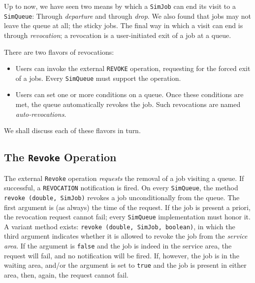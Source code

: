 \documentclass[12pt]{book}
\begin{document}
Up to now,
  we have seen two means by which a \lstinline|SimJob|
  can end its visit to a \lstinline|SimQueue|:
  Through {\em departure\/}
  and through {\em drop}.
We also found that jobs may not leave the queue at all;
  the sticky jobs.
The final way in which a visit can end is through {\em revocation};
  a revocation is a user-initiated exit of a job at a queue.

There are two flavors of revocations:
\begin{itemize}
\item
  Users can invoke the external \lstinline|REVOKE| operation,
    requesting for the forced exit of a jobs.
  Every \lstinline|SimQueue| must support the operation.
\item
  Users can set one or more conditions on a queue.
  Once these conditions are met, the queue automatically
    revokes the job.
  Such revocations are named {\em auto-revocations}.
\end{itemize}

We shall discuss each of these flavors in turn.

\subsection{The \texttt{Revoke} Operation}

The external \lstinline|Revoke| operation
  {\em requests\/} the removal of a job visiting a queue.
If successful,
  a \lstinline|REVOCATION| notification is fired.
On every \lstinline|SimQueue|,
  the method \lstinline|revoke (double, SimJob)|
  revokes a job unconditionally from the queue.
The first argument is (as always)
  the time of the request.
If the job is present a priori,
  the revocation request cannot fail;
  every \lstinline|SimQueue| implementation
  must honor it.
A variant method exists: \lstinline|revoke (double, SimJob, boolean)|,
  in which the third argument indicates
  whether it is allowed to revoke the job
  from the {\em service area}.
If the argument is \lstinline|false| and the job is indeed
  in the service area,
  the request will fail,
  and no notification will be fired.
If, however, the job is in the waiting area,
  and/or the argument is set to \lstinline|true|
  and the job is present in either area,
  then, again, the request cannot fail.
\end{document}
